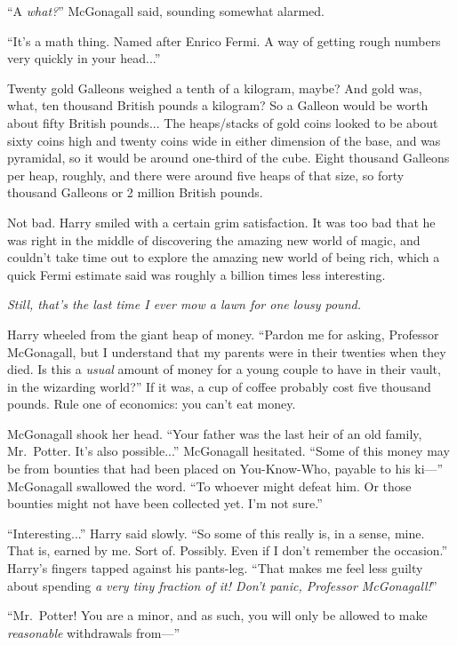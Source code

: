 “A \emph{what?}” McGonagall said, sounding somewhat alarmed.

“It’s a math thing. Named after Enrico Fermi. A way of getting rough numbers very quickly in your head...”

Twenty gold Galleons weighed a tenth of a kilogram, maybe? And gold was, what, ten thousand British pounds a kilogram? So a Galleon would be worth about fifty British pounds... The heaps/stacks of gold coins looked to be about sixty coins high and twenty coins wide in either dimension of the base, and was pyramidal, so it would be around one-third of the cube. Eight thousand Galleons per heap, roughly, and there were around five heaps of that size, so forty thousand Galleons or 2 million British pounds.

Not bad. Harry smiled with a certain grim satisfaction. It was too bad that he was right in the middle of discovering the amazing new world of magic, and couldn’t take time out to explore the amazing new world of being rich, which a quick Fermi estimate said was roughly a billion times less interesting.

\emph{Still, that’s the last time I ever mow a lawn for one lousy pound.}

Harry wheeled from the giant heap of money. “Pardon me for asking, Professor McGonagall, but I understand that my parents were in their twenties when they died. Is this a \emph{usual} amount of money for a young couple to have in their vault, in the wizarding world?” If it was, a cup of coffee probably cost five thousand pounds. Rule one of economics: you can’t eat money.

McGonagall shook her head. “Your father was the last heir of an old family, Mr.~Potter. It’s also possible...” McGonagall hesitated. “Some of this money may be from bounties that had been placed on You-Know-Who, payable to his ki—” McGonagall swallowed the word. “To whoever might defeat him. Or those bounties might not have been collected yet. I’m not sure.”

“Interesting...” Harry said slowly. “So some of this really is, in a sense, mine. That is, earned by me. Sort of. Possibly. Even if I don’t remember the occasion.” Harry’s fingers tapped against his pants-leg. “That makes me feel less guilty about spending \emph{a very tiny fraction of it! Don’t panic, Professor McGonagall!}”

“Mr.~Potter! You are a minor, and as such, you will only be allowed to make \emph{reasonable} withdrawals from—”

